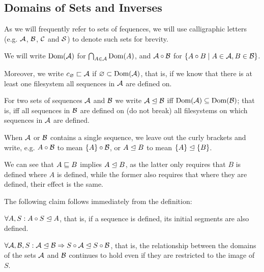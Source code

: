 

\subsection{Domains of Sets and Inverses}

\begin{mydef}
As we will frequently refer to sets of fequences,
we will use calligraphic letters (e.g. $\mathcal{A}$, $\mathcal{B}$, $\mathcal{C}$ and $\mathcal{S}$)
to denote such sets for brevity.

We will write $\textrm{Dom}({\mathcal{A}})$ for $\bigcap_{A\in\mathcal{A}} \textrm{Dom}({A})$,
and $\mathcal{A}\circ\mathcal{B}$ for $\{A\circ B\mathrel{|} A\in\mathcal{A}, B\in\mathcal{B}\}$.

Moreover, we write $c_\varnothing\sqsubset{\mathcal{A}}$ if $\varnothing \subset \textrm{Dom}({\mathcal{A}})$, that is,
if we know that there is at least one filesystem
all sequences in $\mathcal{A}$ are defined on.
\end{mydef}


\begin{mydef}[$\worksmeqsign$]
For two sets of sequences $\mathcal{A}$ and $\mathcal{B}$
we write ${\mathcal{A}}\trianglelefteq{\mathcal{B}}$ iff $\textrm{Dom}({\mathcal{A}}) \subseteq \textrm{Dom}({\mathcal{B}})$;
that is, iff all sequences in $\mathcal{B}$ are defined on (do not break)
all filesystems on which sequences in $\mathcal{A}$ are defined.
\end{mydef}

When $\mathcal{A}$ or $\mathcal{B}$ contains a single sequence,
we leave out the curly brackets and write,
e.g. $A\circ\mathcal{B}$ to mean $\{A\}\circ\mathcal{B}$,
or ${A}\trianglelefteq{B}$ to mean ${\{{A}\}}\trianglelefteq{\{{B}\}}$.

We can see that $A\sqsubseteq B$ implies ${A}\trianglelefteq{B}$, as the latter
only requires that $B$ is defined where $A$ is defined, 
while the former also requires
that where they are defined, their effect is the same.

The following claim follows immediately from the definition:

\begin{myclm}
$\forall A,S: {A\circ S}\trianglelefteq{A}$, that is, if a sequence is defined,
its initial segments are also defined.
\end{myclm}

\begin{myclm}
$\forall \mathcal{A},\mathcal{B},S: {\mathcal{A}}\trianglelefteq{\mathcal{B}} \Rightarrow {S\circ\mathcal{A}}\trianglelefteq{S\circ\mathcal{B}}$, that is,
the relationship between the domains of the sets $\mathcal{A}$ and $\mathcal{B}$ continues to hold
even if they are restricted to the image of $S$.
\end{myclm}

